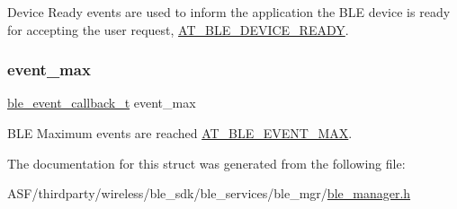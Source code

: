 Device Ready event\textquotesingle{}s are used to inform the application the B\+LE device is ready for accepting the user request, \mbox{\hyperlink{at__ble__api_8h_a3324640b95f33169515f89738ed5baeba4e0471236a4d570dc8e5bc42937f2dc4}{A\+T\+\_\+\+B\+L\+E\+\_\+\+D\+E\+V\+I\+C\+E\+\_\+\+R\+E\+A\+DY}}. 

\mbox{\label{structble__custom__event__cb_a2a03c6107197035010df31d1c99e4100}} 
\subsubsection{\texorpdfstring{event\_max}{event\_max}}
{\footnotesize\ttfamily \mbox{\hyperlink{ble__manager_8h_a04ce4bb8cb8282f2762e3924b1773cc9}{ble\+\_\+event\+\_\+callback\+\_\+t}} event\+\_\+max}



B\+LE Maximum events are reached \mbox{\hyperlink{at__ble__api_8h_a3324640b95f33169515f89738ed5baeba6ec96e354e65e3d209e0873eb5ae1a90}{A\+T\+\_\+\+B\+L\+E\+\_\+\+E\+V\+E\+N\+T\+\_\+\+M\+AX}}. 



The documentation for this struct was generated from the following file\+:\begin{DoxyCompactItemize}
\item 
A\+S\+F/thirdparty/wireless/ble\+\_\+sdk/ble\+\_\+services/ble\+\_\+mgr/\mbox{\hyperlink{ble__manager_8h}{ble\+\_\+manager.\+h}}\end{DoxyCompactItemize}
